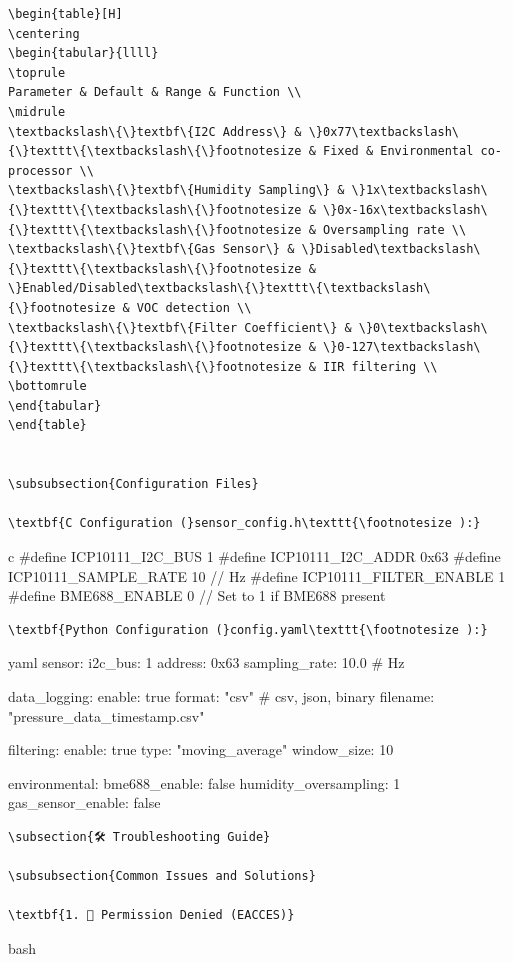 \documentclass[11pt,a4paper]{article}
\begin{document}
\begin{lstlisting}[language=text]
\begin{table}[H]
\centering
\begin{tabular}{llll}
\toprule
Parameter & Default & Range & Function \\
\midrule
\textbackslash\{\}textbf\{I2C Address\} & \}0x77\textbackslash\{\}texttt\{\textbackslash\{\}footnotesize & Fixed & Environmental co-processor \\
\textbackslash\{\}textbf\{Humidity Sampling\} & \}1x\textbackslash\{\}texttt\{\textbackslash\{\}footnotesize & \}0x-16x\textbackslash\{\}texttt\{\textbackslash\{\}footnotesize & Oversampling rate \\
\textbackslash\{\}textbf\{Gas Sensor\} & \}Disabled\textbackslash\{\}texttt\{\textbackslash\{\}footnotesize & \}Enabled/Disabled\textbackslash\{\}texttt\{\textbackslash\{\}footnotesize & VOC detection \\
\textbackslash\{\}textbf\{Filter Coefficient\} & \}0\textbackslash\{\}texttt\{\textbackslash\{\}footnotesize & \}0-127\textbackslash\{\}texttt\{\textbackslash\{\}footnotesize & IIR filtering \\
\bottomrule
\end{tabular}
\end{table}


\subsubsection{Configuration Files}

\textbf{C Configuration (}sensor_config.h\texttt{\footnotesize ):}
\end{lstlisting}c
#define ICP10111_I2C_BUS        1
#define ICP10111_I2C_ADDR       0x63
#define ICP10111_SAMPLE_RATE    10      // Hz
#define ICP10111_FILTER_ENABLE  1
#define BME688_ENABLE           0       // Set to 1 if BME688 present
\begin{lstlisting}[language=text]
\textbf{Python Configuration (}config.yaml\texttt{\footnotesize ):}
\end{lstlisting}yaml
sensor:
  i2c_bus: 1
  address: 0x63
  sampling_rate: 10.0  # Hz
  
data_logging:
  enable: true
  format: "csv"        # csv, json, binary
  filename: "pressure_data_{timestamp}.csv"
  
filtering:
  enable: true
  type: "moving_average"
  window_size: 10

environmental:
  bme688_enable: false
  humidity_oversampling: 1
  gas_sensor_enable: false
\begin{lstlisting}[language=text]
\subsection{🛠️ Troubleshooting Guide}

\subsubsection{Common Issues and Solutions}

\textbf{1. 🚫 Permission Denied (EACCES)}
\end{lstlisting}bash
\end{document}

